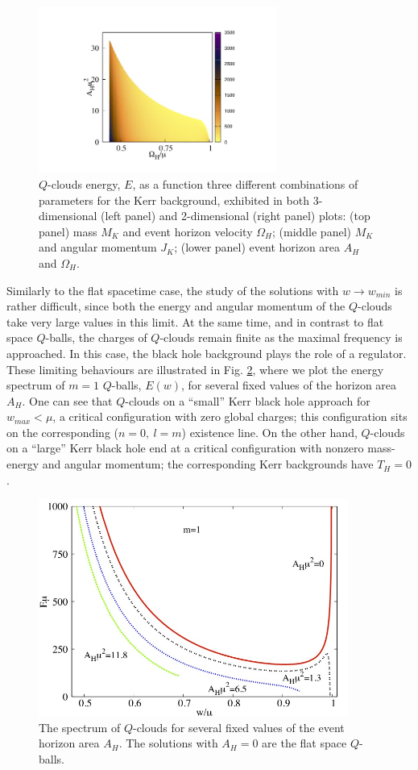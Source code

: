 \begin{figure}[h!]
\includegraphics[height=2.15in]{papers/QClouds/EAHw-2D.jpeg}
\caption{$Q$-clouds energy, $E$, as a function three different combinations of parameters for the Kerr background, exhibited in both 3-dimensional (left panel) and 2-dimensional (right panel) plots: (top panel) mass $M_K$ and event horizon velocity $\Omega_H$; (middle panel) $M_K$ and angular momentum $J_K$; (lower panel) event horizon area $A_H$ and  $\Omega_H$.   
} 
\label{energy1}
\end{figure}

Similarly to the flat spacetime case,
  the study of the solutions with $w\to w_{min}$
  is rather difficult, since
 both the energy and angular momentum of the $Q$-clouds 
 take very large values in this limit. 
 At the same time, and in contrast to flat space $Q$-balls, the charges of $Q$-clouds
 remain finite as the maximal frequency is approached. In this case, the black hole background plays the role of a regulator.
 These limiting behaviours are illustrated in Fig. \ref{spectrum}, where we plot the energy spectrum of $m=1$ $Q$-balls,
 $E(w)$,
 for several fixed values of the horizon area $A_H$.
 One can see that $Q$-clouds on a ``small''  Kerr black hole
 approach  for $w_{max}<\mu$,
 a critical configuration with zero global charges; this configuration sits 
 on the corresponding ($n=0,~l=m$)  existence line.
On the other hand, $Q$-clouds on a ``large'' Kerr black hole 
 end at a critical configuration with nonzero mass-energy and angular momentum;
 the corresponding Kerr backgrounds have $T_H=0$. 
 
 \begin{figure}[h!]
\centering
\includegraphics[height=2.8in]{papers/QClouds/Ew-fixed-AH.jpeg}
\caption{The spectrum of $Q$-clouds for several
fixed values of the event horizon area $A_H$.
The solutions with $A_H=0$
are the flat space $Q$-balls.} 
\label{spectrum}
\end{figure}
   
